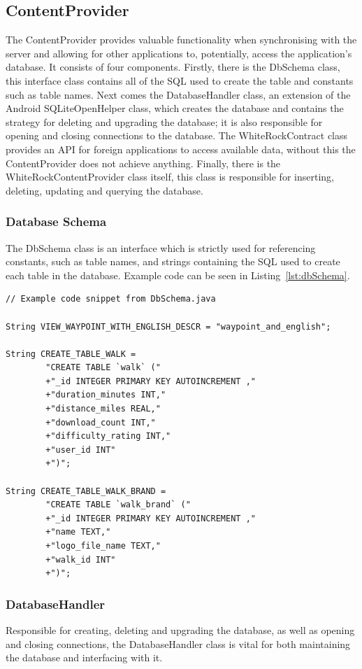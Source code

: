 \documentclass[11pt,a4paper]{article}
\begin{document}
\subsection{ContentProvider}
\label{sec:contentprovier}
The ContentProvider provides valuable functionality when synchronising with the server and allowing for other applications to, potentially, access the application's database. It consists of four components. Firstly, there is the DbSchema class, this interface class contains all of the SQL used to create the table and constants such as table names. Next comes the DatabaseHandler class, an extension of the Android SQLiteOpenHelper class, which creates the database and contains the strategy for deleting and upgrading the database; it is also responsible for opening and closing connections to the database. The WhiteRockContract class provides an API for foreign applications to access available data, without this the ContentProvider does not achieve anything. Finally, there is the WhiteRockContentProvider class itself, this class is responsible for inserting, deleting, updating and querying the database.

\subsubsection{Database Schema}
The DbSchema class is an interface which is strictly used for referencing constants, such as table names, and strings containing the SQL used to create each table in the database. Example code can be seen in Listing~\ref{lst:dbSchema}.

\begin{lstlisting}[captionpos=b, caption=DbSchema Snippet, label=lst:dbSchema, frame=single]
// Example code snippet from DbSchema.java

String VIEW_WAYPOINT_WITH_ENGLISH_DESCR = "waypoint_and_english";

String CREATE_TABLE_WALK =
		"CREATE TABLE `walk` ("
		+"_id INTEGER PRIMARY KEY AUTOINCREMENT ,"
		+"duration_minutes INT,"
		+"distance_miles REAL,"
		+"download_count INT,"
        +"difficulty_rating INT,"
		+"user_id INT"
		+")";

String CREATE_TABLE_WALK_BRAND =
		"CREATE TABLE `walk_brand` ("
		+"_id INTEGER PRIMARY KEY AUTOINCREMENT ,"
		+"name TEXT,"
		+"logo_file_name TEXT,"
        +"walk_id INT"
		+")";

\end{lstlisting}

\subsubsection{DatabaseHandler}
Responsible for creating, deleting and upgrading the database, as well as opening and closing connections, the DatabaseHandler class is vital for both maintaining the database and interfacing with it.
\end{document}
